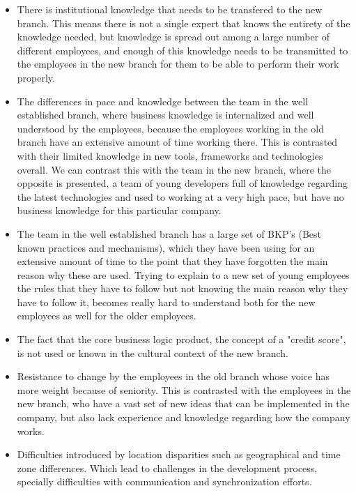 \documentclass[12pt, letterpaper]{article}
\begin{document}
\begin{itemize}
  \item There is institutional knowledge that needs to be transfered to the new branch. This means there is not a single expert that 
  knows the entirety of the knowledge needed, but knowledge is spread out among a 
large number of different employees, and enough of this knowledge needs to be transmitted to the employees in the new 
branch for them to be able to perform their work properly.
  \item The differences in pace and knowledge between the team in the well established branch, where  
  business knowledge is internalized and well understood by the employees, because the employees working in the old branch have an extensive amount of time working there. This is contrasted with their limited knowledge in new tools, 
  frameworks and technologies overall. We can contrast this with the team in the new branch, where the opposite is
  presented, a team of young developers full of knowledge regarding the latest technologies and used to working at a 
  very high pace, but have no business knowledge for this particular company. 
  \item The team in the well established branch has a large set of BKP's (Best known practices and mechanisms), 
  which they have been using for an extensive amount of time to the point that they have forgotten the main reason
  why these are used. Trying to explain to a new set of young employees the rules that they have to follow but not
  knowing the main reason why they have to follow it, becomes really hard to understand both for the new employees
  as well for the older employees.
  \item The fact that the core business logic product, the concept of a "credit score", is not used or known in the 
cultural context of the new branch.
  \item Resistance to change by the employees in the old branch whose voice has more weight
  because of seniority. This is contrasted with the employees in the new branch, who have a vast set of new ideas 
  that can be implemented in the company, but also lack experience and knowledge regarding how the company works.
  \item Difficulties introduced by location disparities such as geographical and time zone differences. Which lead to 
  challenges in the development process, specially difficulties with communication and synchronization efforts.
\end{itemize}
\end{document}
